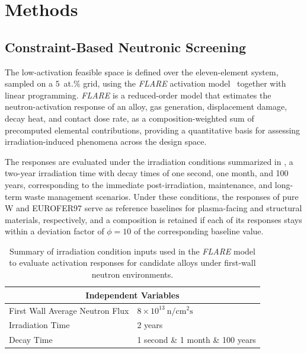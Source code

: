 \section{Methods}
\subsection{Constraint-Based Neutronic Screening}
\label{sec:feasible-space}

The low-activation feasible space is defined over the eleven-element
 system, sampled on a \(5\)~at.\% grid, using
the \emph{FLARE} activation model~\cite{flare} together with linear programming.
\emph{FLARE} is a reduced-order model that estimates the neutron-activation
response of an alloy, gas generation, displacement damage, decay heat, and contact
dose rate, as a composition-weighted sum of precomputed elemental contributions,
providing a quantitative basis for assessing irradiation-induced phenomena across
the design space.

The responses are evaluated under the irradiation conditions summarized in
, a two-year irradiation time with decay times of one
second, one month, and 100 years, corresponding to the immediate post-irradiation,
maintenance, and long-term waste management scenarios. Under these conditions, the
responses of pure W and EUROFER97 serve as reference baselines for plasma-facing
and structural materials, respectively, and a composition is retained if each of
its responses stays within a deviation factor of \(\phi=10\) of the corresponding
baseline value.

\begin{table}[H]
\centering
\caption{Summary of irradiation condition inputs used in the \emph{FLARE} model to
evaluate activation responses for candidate alloys under first-wall neutron
environments.}
\label{tab:ind_variables}
\begin{tabularx}{\columnwidth}{lX}
\toprule
\multicolumn{2}{c}{\textbf{Independent Variables}} \\
\midrule
First Wall Average Neutron Flux & \(8\times10^{13}~\mathrm{n/cm^2 s}\) \\
Irradiation Time               & 2 years \\
Decay Time                     & 1 second \& 1 month \& 100 years \\
\bottomrule
\end{tabularx}
\end{table}

